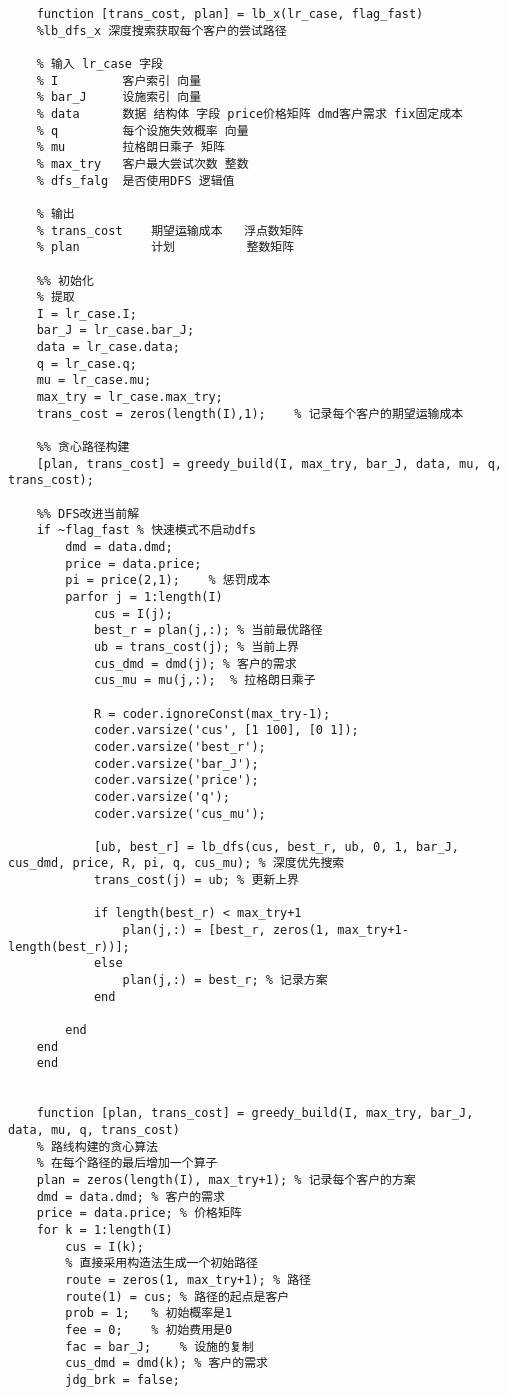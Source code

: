 {\begin{lstlisting}
    function [trans_cost, plan] = lb_x(lr_case, flag_fast)
    %lb_dfs_x 深度搜索获取每个客户的尝试路径

    % 输入 lr_case 字段
    % I         客户索引 向量
    % bar_J     设施索引 向量
    % data      数据 结构体 字段 price价格矩阵 dmd客户需求 fix固定成本
    % q         每个设施失效概率 向量
    % mu        拉格朗日乘子 矩阵
    % max_try   客户最大尝试次数 整数
    % dfs_falg  是否使用DFS 逻辑值

    % 输出
    % trans_cost    期望运输成本   浮点数矩阵
    % plan          计划          整数矩阵

    %% 初始化
    % 提取
    I = lr_case.I;
    bar_J = lr_case.bar_J;
    data = lr_case.data;
    q = lr_case.q;
    mu = lr_case.mu;
    max_try = lr_case.max_try;
    trans_cost = zeros(length(I),1);    % 记录每个客户的期望运输成本

    %% 贪心路径构建
    [plan, trans_cost] = greedy_build(I, max_try, bar_J, data, mu, q, trans_cost);

    %% DFS改进当前解
    if ~flag_fast % 快速模式不启动dfs
        dmd = data.dmd;
        price = data.price;
        pi = price(2,1);    % 惩罚成本
        parfor j = 1:length(I)
            cus = I(j);
            best_r = plan(j,:); % 当前最优路径
            ub = trans_cost(j); % 当前上界
            cus_dmd = dmd(j); % 客户的需求
            cus_mu = mu(j,:);  % 拉格朗日乘子

            R = coder.ignoreConst(max_try-1);
            coder.varsize('cus', [1 100], [0 1]);
            coder.varsize('best_r');
            coder.varsize('bar_J');
            coder.varsize('price');
            coder.varsize('q');
            coder.varsize('cus_mu');

            [ub, best_r] = lb_dfs(cus, best_r, ub, 0, 1, bar_J, cus_dmd, price, R, pi, q, cus_mu); % 深度优先搜索
            trans_cost(j) = ub; % 更新上界

            if length(best_r) < max_try+1
                plan(j,:) = [best_r, zeros(1, max_try+1-length(best_r))];
            else
                plan(j,:) = best_r; % 记录方案
            end

        end
    end
    end


    function [plan, trans_cost] = greedy_build(I, max_try, bar_J, data, mu, q, trans_cost)
    % 路线构建的贪心算法
    % 在每个路径的最后增加一个算子
    plan = zeros(length(I), max_try+1); % 记录每个客户的方案
    dmd = data.dmd; % 客户的需求
    price = data.price; % 价格矩阵
    for k = 1:length(I)
        cus = I(k);
        % 直接采用构造法生成一个初始路径
        route = zeros(1, max_try+1); % 路径
        route(1) = cus; % 路径的起点是客户
        prob = 1;   % 初始概率是1
        fee = 0;    % 初始费用是0
        fac = bar_J;    % 设施的复制
        cus_dmd = dmd(k); % 客户的需求
        jdg_brk = false;
        

\end{lstlisting}}
